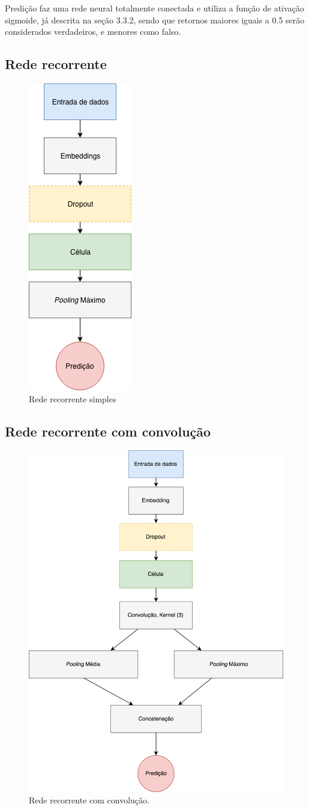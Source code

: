 \documentclass[12pt]{article}
\begin{document}
Predição faz uma rede neural totalmente conectada e utiliza a função de ativação sigmoide, já descrita na seção 3.3.2,  sendo que retornos maiores iguais a 0.5 serão considerados verdadeiros, e menores como falso.

\subsection{Rede recorrente}

\begin{figure}[!htb]
\centering
\includegraphics[width=.2\textwidth]{images/graph_2.png}
\caption{Rede recorrente simples}
\label{fig:graph_2}
\end{figure}
\FloatBarrier

\subsection{Rede recorrente com convolução}

\begin{figure}[!htb]
\centering
\includegraphics[width=.5\textwidth]{images/graph.png}
\caption{Rede recorrente com convolução.}
\label{fig:graph}
\end{figure}
\FloatBarrier
\end{document}
